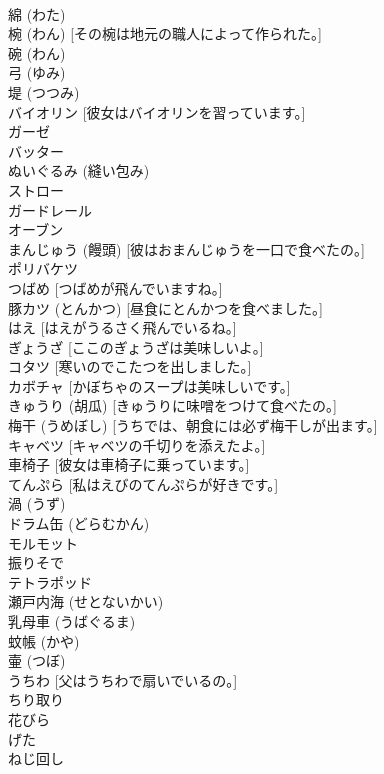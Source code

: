 \documentclass[8pt]{extreport}
\begin{document}
\begin{CJK}{UTF8}{min}
\\	綿 (わた)
\\	椀 (わん) [その椀は地元の職人によって作られた。]
\\	碗 (わん)
\\	弓 (ゆみ)
\\	堤 (つつみ)
\\	バイオリン [彼女はバイオリンを習っています。]
\\	ガーゼ
\\	バッター
\\	ぬいぐるみ (縫い包み)
\\	ストロー
\\	ガードレール
\\	オーブン
\\	まんじゅう (饅頭) [彼はおまんじゅうを一口で食べたの。]
\\	ポリバケツ
\\	つばめ [つばめが飛んでいますね。]
\\	豚カツ (とんかつ) [昼食にとんかつを食べました。]
\\	はえ [はえがうるさく飛んでいるね。]
\\	ぎょうざ [ここのぎょうざは美味しいよ。]
\\	コタツ [寒いのでこたつを出しました。]
\\	カボチャ [かぼちゃのスープは美味しいです。]
\\	きゅうり (胡瓜) [きゅうりに味噌をつけて食べたの。]
\\	梅干 (うめぼし) [うちでは、朝食には必ず梅干しが出ます。]
\\	キャベツ [キャベツの千切りを添えたよ。]
\\	車椅子 [彼女は車椅子に乗っています。]
\\	てんぷら [私はえびのてんぷらが好きです。]
\\	渦 (うず)
\\	ドラム缶 (どらむかん)
\\	モルモット
\\	振りそで
\\	テトラポッド
\\	瀬戸内海 (せとないかい)
\\	乳母車 (うばぐるま)
\\	蚊帳 (かや)
\\	壷 (つぼ)
\\	うちわ [父はうちわで扇いでいるの。]
\\	ちり取り
\\	花びら
\\	げた
\\	ねじ回し

\end{CJK}
\end{document}
